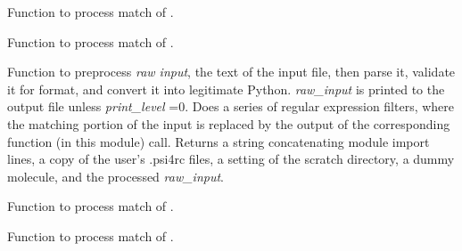 \documentclass[letterpaper,10pt,english]{sphinxmanual}
\begin{document}
\begin{fulllineitems}
\label{index:input.process_external_command}
Function to process match of .

\end{fulllineitems}


\begin{fulllineitems}
\label{index:input.process_extract_command}
Function to process match of .

\end{fulllineitems}


\begin{fulllineitems}
\label{index:input.process_input}
Function to preprocess \emph{raw input}, the text of the input file, then
parse it, validate it for format, and convert it into legitimate Python.
\emph{raw\_input} is printed to the output file unless \emph{print\_level} =0. Does
a series of regular expression filters, where the matching portion of the
input is replaced by the output of the corresponding function (in this
module) call. Returns a string concatenating module import lines, a copy
of the user's .psi4rc files, a setting of the scratch directory, a dummy
molecule, and the processed \emph{raw\_input}.

\end{fulllineitems}


\begin{fulllineitems}
\label{index:input.process_memory_command}
Function to process match of .

\end{fulllineitems}


\begin{fulllineitems}
\label{index:input.process_molecule_command}
Function to process match of .

\end{fulllineitems}
\end{document}
